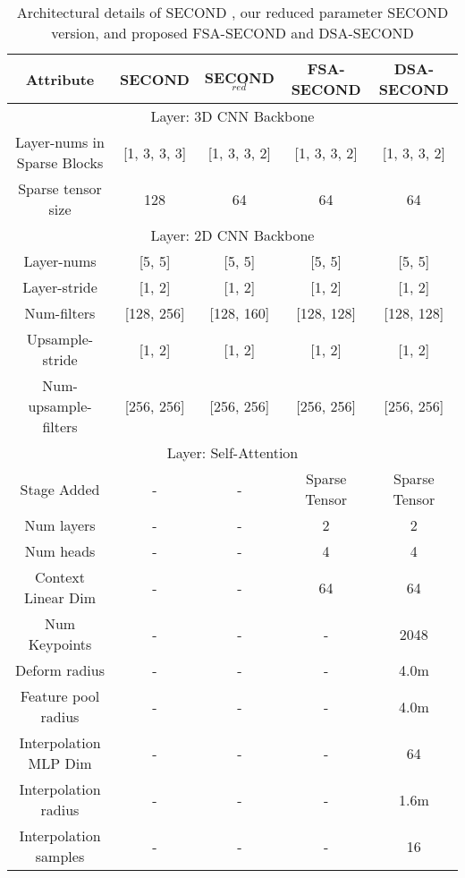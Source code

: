 \documentclass[10pt,twocolumn,letterpaper]{article}
\begin{document}
\begin{table*}[t]
    \centering
    \begin{tabular*}{\textwidth}{|c||c|c|c|c|}
        \hline
        Attribute & SECOND \cite{SECOND} & SECOND$_{red}$ & FSA-SECOND & DSA-SECOND \\
        \hline
        \hline
        \multicolumn{5}{|c|}{Layer: 3D CNN Backbone}  \\ \cline{1-5}
        \hline
         Layer-nums in Sparse Blocks & [1, 3, 3, 3] & [1, 3, 3, 2] & [1, 3, 3, 2] & [1, 3, 3, 2]\\
         \hline
         Sparse tensor size & 128 & 64 & 64 & 64 \\
         \hline
         \hline
         \multicolumn{5}{|c|}{Layer: 2D CNN Backbone}  \\ 
        \hline
        \hline
         Layer-nums & [5, 5] & [5, 5] & [5, 5] & [5, 5]\\
         \hline
         Layer-stride & [1, 2] & [1, 2] & [1, 2] & [1, 2] \\
         \hline
         Num-filters & [128, 256] & [128, 160] & [128, 128] & [128, 128] \\
         \hline
         Upsample-stride & [1, 2] & [1, 2] & [1, 2] & [1, 2] \\
         \hline
         Num-upsample-filters & [256, 256] & [256, 256] & [256, 256] & [256, 256] \\
         \hline
         \hline
        \multicolumn{5}{|c|}{Layer: Self-Attention}  \\ 
        \hline
        \hline
        Stage Added & - & - & Sparse Tensor & Sparse Tensor \\
         \hline
          Num layers & - & - & 2 & 2 \\
         \hline
          Num heads & - & - & 4 & 4 \\
          \hline
         Context Linear Dim & - & - & 64 & 64 \\
         \hline
         Num Keypoints & - & - & - & 2048 \\
         \hline
         Deform radius & - & - & - & 4.0m \\
         \hline
         Feature pool radius & - & - & - & 4.0m \\
         \hline
         Interpolation MLP Dim & - & - & - & 64 \\
         \hline
         Interpolation radius & - & - & - & 1.6m \\
         \hline
         Interpolation samples & - & - & - & 16 \\
         \hline
         
    \end{tabular*}
    \caption{Architectural details of SECOND \cite{SECOND}, our reduced parameter SECOND version, and proposed FSA-SECOND and DSA-SECOND}
    \label{tab:second_archi}
\end{table*} \setlength{\tabcolsep}{0.43pt}
\end{document}
